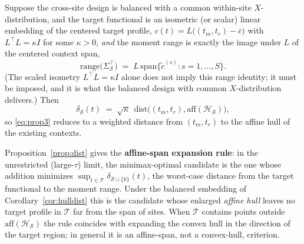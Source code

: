 \begin{corollary}
\label{cor:hulldist}
Suppose the cross-site design is balanced with a common within-site
$X$-distribution, and the target functional is an isometric (or scalar) linear
embedding of the centered target profile,
$c(t)=L\bigl((t_m,t_r)-\bar c\bigr)$ with $L^\top L=\kappa I$ for some
$\kappa>0$, \emph{and} the moment range is exactly the image under $L$ of the
centered context span,
\[
\mathrm{range}\bigl(\Sigma_\mathcal{S}^\top\bigr)
 \;=\; L\,\mathrm{span}\bigl\{\tilde c^{(s)}:s=1,\dots,S\bigr\}.
\]
(The scaled isometry $L^\top L=\kappa I$ alone does not imply this range
identity; it must be imposed, and it is what the balanced design with common
$X$-distribution delivers.) Then
\[
\delta_\mathcal{S}(t)\;=\;\sqrt{\kappa}\;\,
 \mathrm{dist}\bigl((t_m,t_r),\mathrm{aff}(\mathcal{H}_\mathcal{S})\bigr),
\]
so \eqref{eq:prop3} reduces to a weighted distance from $(t_m,t_r)$ to the
affine hull of the existing contexts.
\end{corollary}

Proposition~\ref{prop:dist} gives the \textbf{affine-span expansion rule}: in
the unrestricted (large-$\tau$) limit, the minimax-optimal candidate is the one
whose addition minimizes $\sup_{t \in \mathcal{T}} \delta_{\mathcal{S}\cup\{k\}}(t)$,
the worst-case distance from the target functional to the moment range. Under
the balanced embedding of Corollary~\ref{cor:hulldist} this is the candidate
whose enlarged \emph{affine hull} leaves no target profile in $\mathcal{T}$ far
from the span of sites. When $\mathcal{T}$ contains points outside
$\mathrm{aff}(\mathcal{H}_\mathcal{S})$ the rule coincides with expanding the
convex hull in the direction of the target region; in general it is an
affine-span, not a convex-hull, criterion.
